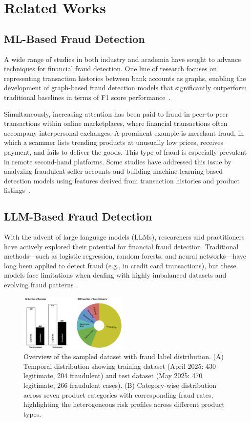 \documentclass[sigconf]{acmart}
\begin{document}
\section{Related Works}\label{related_work}
\subsection{ML-Based Fraud Detection}
A wide range of studies in both industry and academia have sought to advance techniques for financial fraud detection. One line of research focuses on representing transaction histories between bank accounts as graphs, enabling the development of graph-based fraud detection models that significantly outperform traditional baselines in terms of F1 score performance~\cite{lin2024graphtransformer, yoo2023medicare}.

Simultaneously, increasing attention has been paid to fraud in peer-to-peer transactions within online marketplaces, where financial transactions often accompany interpersonal exchanges. A prominent example is merchant fraud, in which a scammer lists trending products at unusually low prices, receives payment, and fails to deliver the goods. This type of fraud is especially prevalent in remote second-hand platforms. Some studies have addressed this issue by analyzing fraudulent seller accounts and building machine learning-based detection models using features derived from transaction histories and product listings~\cite{hasan2022ecommerce, renjith2018}.

\subsection{LLM-Based Fraud Detection}  
With the advent of large language models (LLMs), researchers and practitioners have actively explored their potential for financial fraud detection. Traditional methods—such as logistic regression, random forests, and neural networks—have long been applied to detect fraud (e.g., in credit card transactions), but these models face limitations when dealing with highly imbalanced datasets and evolving fraud patterns~\cite{yu2024card_fds}.



\begin{figure}[t!]
  \centering
  \includegraphics[width=0.48\textwidth]{figures/fig_dataset.png}
  \caption{Overview of the sampled dataset with fraud label distribution. (A) Temporal distribution showing training dataset (April 2025: 430 legitimate, 204 fraudulent) and test dataset (May 2025: 470 legitimate, 266 fraudulent cases). (B) Category-wise distribution across seven product categories with corresponding fraud rates, highlighting the heterogeneous risk profiles across different product types.}
  \label{fig_dataset}
\end{figure}
\end{document}
